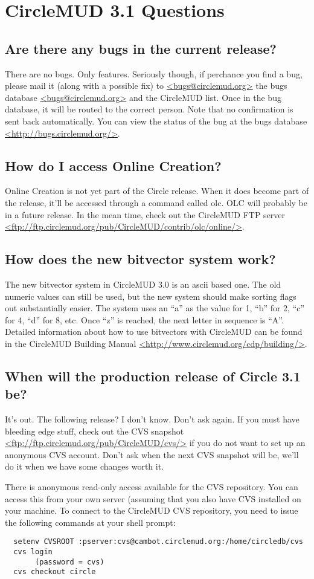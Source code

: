 \documentclass[11pt]{article}
\begin{document}
\section{CircleMUD 3.1 Questions}
\subsection{Are there any bugs in the current release?}
There are no bugs.  Only features.  Seriously though, if perchance you find a bug, please mail it (along with a possible fix) to \url{<bugs@circlemud.org>} the bugs database \url{<bugs@circlemud.org>} and the CircleMUD list.  Once in the bug database, it will be routed to the correct person.  Note that no confirmation is sent back automatically.  You can view the status of the bug at the bugs database \url{<http://bugs.circlemud.org/>}.
 
\subsection{How do I access Online Creation?}
Online Creation is not yet part of the Circle release. When it does become part of the release, it'll be accessed through a command called olc. OLC will probably be in a future release. In the mean time, check out the CircleMUD FTP server \url{<ftp://ftp.circlemud.org/pub/CircleMUD/contrib/olc/online/>}.

\subsection{How does the new bitvector system work?}
The new bitvector system in CircleMUD 3.0 is an ascii based one. The old numeric values can still be used, but the new system should make sorting flags out substantially easier.  The system uses an ``a'' as the value for 1, ``b'' for 2, ``c'' for 4, ``d'' for 8, etc.  Once ``z'' is reached, the next letter in sequence is ``A''.  Detailed information about how to use bitvectors with CircleMUD can be found in the CircleMUD Building Manual \url{<http://www.circlemud.org/cdp/building/>}.

\subsection{When will the production release of Circle 3.1 be?}
It's out.  The following release? I don't know.  Don't ask again. If you must have bleeding edge stuff, check out the CVS snapshot \url{<ftp://ftp.circlemud.org/pub/CircleMUD/cvs/>} if you do not want to set up an anonymous CVS account.  Don't ask when the next CVS snapshot will be, we'll do it when we have some changes worth it.
\par
There is anonymous read-only access available for the CVS repository.  You can access this from your own server (assuming that you also have CVS installed on your machine.  To connect to the CircleMUD CVS repository, you need to issue the following commands at your shell prompt:
\begin{verbatim}
  setenv CVSROOT :pserver:cvs@cambot.circlemud.org:/home/circledb/cvs
  cvs login
       (password = cvs)
  cvs checkout circle
\end{verbatim}
\end{document}
